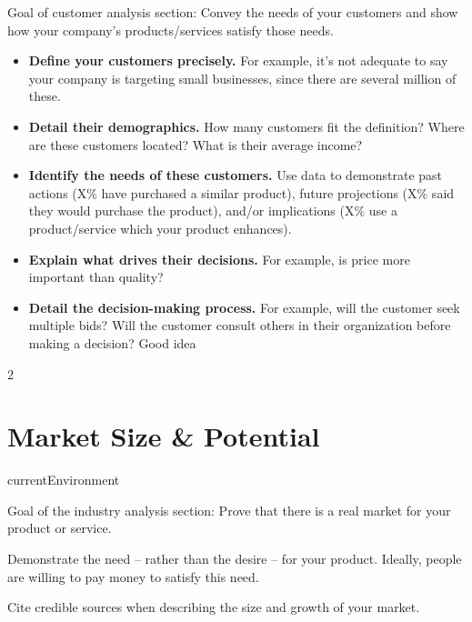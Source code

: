 \documentclass[9pt,]{book}
\providecommand{\tightlist}{%
  \setlength{\itemsep}{0pt}\setlength{\parskip}{0pt}}
\begin{document}
Goal of customer analysis section: Convey the needs of your customers
and show how your company's products/services satisfy those needs.

\begin{itemize}
\tightlist
\item
  \textbf{Define your customers precisely.} For example, it's not
  adequate to say your company is targeting small businesses, since
  there are several million of these.
\item
  \textbf{Detail their demographics.} How many customers fit the
  definition? Where are these customers located? What is their average
  income?
\item
  \textbf{Identify the needs of these customers.} Use data to
  demonstrate past actions (X\% have purchased a similar product),
  future projections (X\% said they would purchase the product), and/or
  implications (X\% use a product/service which your product enhances).
\item
  \textbf{Explain what drives their decisions.} For example, is price
  more important than quality?
\item
  \textbf{Detail the decision-making process.} For example, will the
  customer seek multiple bids? Will the customer consult others in their
  organization before making a decision? Good idea
\end{itemize}

\begin {multicols}{2}

\lipsum

\end {multicols}

\hypertarget{market-size-potential}{%
\section{Market Size \& Potential}\label{market-size-potential}}

currentEnvironment

Goal of the industry analysis section: Prove that there is a real market
for your product or service.

Demonstrate the need -- rather than the desire -- for your product.
Ideally, people are willing to pay money to satisfy this need.

Cite credible sources when describing the size and growth of your
market.
\end{document}
